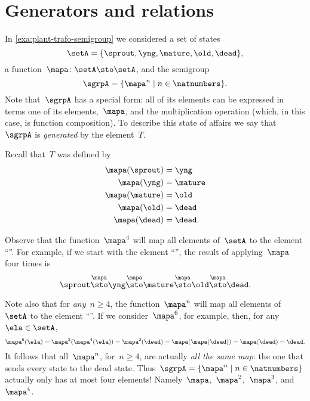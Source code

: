 
\clearmargin


\section{Generators and relations}


In \cref{exa:plant-trafo-semigroup} we considered a set of states
%
\begin{equation}
    \setA= \{ \sprout, \yng, \mature, \old, \dead \},
\end{equation}
%
a function~$\mapa \colon \setA \sto \setA$, and the semigroup
%
\begin{equation}
    \label{eq:trafo-sgrp-one-gen}
    \sgrpA = \{ \mapa^n \mid n \in \natnumbers \}.
\end{equation}
%
Note that~$\sgrpA$ has a special form: all of its elements can be expressed in terms one of its elements,~$\mapa$, and the multiplication operation (which, in this case, is function composition).
To describe this state of affairs we say that~$\sgrpA$ is \emph{generated} by the element~$T$.


Recall that~$T$ was defined by
%
\begin{align*}
    \mapa(\sprout) &=  \yng \\
    \mapa(\yng) &=  \mature \\
    \mapa(\mature) &=  \old \\
    \mapa( \old) &= \dead \\
    \mapa(\dead) &= \dead.
\end{align*}

Observe that the function~$\mapa^4$ will map all elements of~$\setA$ to the element ``\dead''.
For example, if we start with the element ``\sprout'', the result of applying~$\mapa$ four times is
%
\begin{equation*}
    \sprout \overset{\mapa}{\sto} \yng \overset{\mapa}{\sto} \mature \overset{\mapa}{\sto} \old \overset{\mapa}{\sto} \dead.
\end{equation*}

Note also that for \emph{any}~$n \geq 4$, the function~$\mapa^n$ will map all elements of~$\setA$ to the element ``\dead''.
If we consider~$\mapa^6$, for example, then, for any~$\ela \in \setA$,
%
\begin{equation*}
    \mapa^6(\ela) = \mapa^2(\mapa^4(\ela)) = \mapa^2(\dead) = \mapa(\mapa(\dead)) = \mapa(\dead) = \dead.
\end{equation*}
%
It follows that all~$\mapa^n$, for~$n \geq 4$, are actually \emph{all the same map}: the one that sends every state to the dead state.
Thus~$\sgrpA = \{ \mapa^n \mid n \in \natnumbers \}$ actually only has at most four elements! Namely~$\mapa$,~$\mapa^2$,~$\mapa^3$, and~$\mapa^4$.

